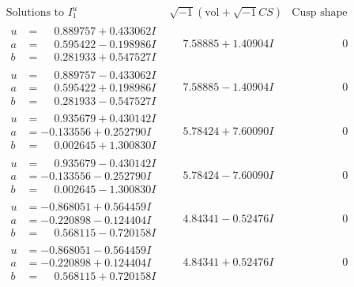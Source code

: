 \documentclass[1p]{elsarticle_modified}
\theoremstyle{definition}
\newcommand{\I}{\sqrt{-1}}
\begin{document}
$$\begin{array}{c|c|c}  
\text{Solutions to }I^u_{1}& \I (\text{vol} + \sqrt{-1}CS) & \text{Cusp shape}\\
 \hline 
\begin{aligned}
u &= \phantom{-}0.889757 + 0.433062 I \\
a &= \phantom{-}0.595422 - 0.198986 I \\
b &= \phantom{-}0.281933 + 0.547527 I\end{aligned}
 & \phantom{-}7.58885 + 1.40904 I & \phantom{-0.000000 } 0 \\ \hline\begin{aligned}
u &= \phantom{-}0.889757 - 0.433062 I \\
a &= \phantom{-}0.595422 + 0.198986 I \\
b &= \phantom{-}0.281933 - 0.547527 I\end{aligned}
 & \phantom{-}7.58885 - 1.40904 I & \phantom{-0.000000 } 0 \\ \hline\begin{aligned}
u &= \phantom{-}0.935679 + 0.430142 I \\
a &= -0.133556 + 0.252790 I \\
b &= \phantom{-}0.002645 + 1.300830 I\end{aligned}
 & \phantom{-}5.78424 + 7.60090 I & \phantom{-0.000000 } 0 \\ \hline\begin{aligned}
u &= \phantom{-}0.935679 - 0.430142 I \\
a &= -0.133556 - 0.252790 I \\
b &= \phantom{-}0.002645 - 1.300830 I\end{aligned}
 & \phantom{-}5.78424 - 7.60090 I & \phantom{-0.000000 } 0 \\ \hline\begin{aligned}
u &= -0.868051 + 0.564459 I \\
a &= -0.220898 - 0.124404 I \\
b &= \phantom{-}0.568115 - 0.720158 I\end{aligned}
 & \phantom{-}4.84341 - 0.52476 I & \phantom{-0.000000 } 0 \\ \hline\begin{aligned}
u &= -0.868051 - 0.564459 I \\
a &= -0.220898 + 0.124404 I \\
b &= \phantom{-}0.568115 + 0.720158 I\end{aligned}
 & \phantom{-}4.84341 + 0.52476 I & \phantom{-0.000000 } 0 \\ \hline\begin{aligned}

\end{aligned}
\end{array}$$
\end{document}
